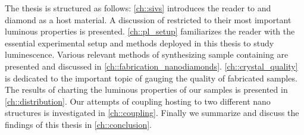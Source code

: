 	The thesis is structured as follows: \autoref{ch::sivs} introduces the reader to \ccs and diamond as a host material. A discussion of \sivs restricted to their most important luminous properties is presented. \autoref{ch::pl_setup} familiarizes the reader with the essential experimental setup and methods deployed in this thesis to study \siv luminescence. Various relevant methods of synthesizing sample \nds containing \sivs are presented and discussed in \autoref{ch::fabrication_nanodiamonds}. \autoref{ch::crystal_quality} is dedicated to the important topic of gauging the quality of fabricated samples. The results of charting the luminous properties of our \nds samples is presented in \autoref{ch::distribution}. Our attempts of coupling \nds hosting \sivs to two different nano structures is investigated in \autoref{ch::coupling}. Finally we summarize and discuss the findings of this thesis in \autoref{ch::conclusion}.

